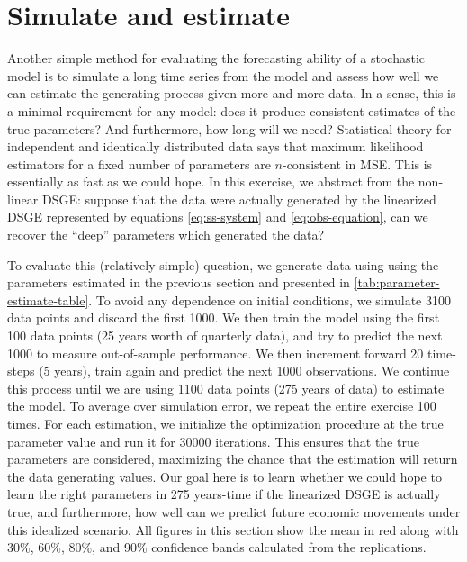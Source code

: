\documentclass[11pt]{article}
\begin{document}
\hypertarget{sec:simulate-estimate}{%
\section{Simulate and estimate}\label{sec:simulate-estimate}}

Another simple method for evaluating the forecasting ability of a
stochastic model is to simulate a long time series from the model and
assess how well we can estimate the generating process given more and
more data. In a sense, this is a minimal requirement for any model: does
it produce consistent estimates of the true parameters? And furthermore,
how long will we need? Statistical theory for independent and
identically distributed data says that maximum likelihood estimators for
a fixed number of parameters are \(n\)-consistent in MSE. This is
essentially as fast as we could hope. In this exercise, we abstract from
the non-linear DSGE: suppose that the data were actually generated by
the linearized DSGE represented by equations \eqref{eq:ss-system} and
\eqref{eq:obs-equation}, can we recover the ``deep'' parameters which
generated the data?

To evaluate this (relatively simple) question, we generate data using
using the parameters estimated in the previous section and presented in
\autoref{tab:parameter-estimate-table}. To avoid any dependence on
initial conditions, we simulate 3100 data points and discard the first
1000. We then train the model using the first 100 data points (25 years
worth of quarterly data), and try to predict the next 1000 to measure
out-of-sample performance. We then increment forward 20 time-steps (5
years), train again and predict the next 1000 observations. We continue
this process until we are using 1100 data points (275 years of data) to
estimate the model. To average over simulation error, we repeat the
entire exercise 100 times. For each estimation, we initialize the
optimization procedure at the true parameter value and run it for 30000
iterations. This ensures that the true parameters are considered,
maximizing the chance that the estimation will return the data
generating values. Our goal here is to learn whether we could hope to
learn the right parameters in 275 years-time if the linearized DSGE is
actually true, and furthermore, how well can we predict future economic
movements under this idealized scenario. All figures in this section
show the mean in red along with 30\%, 60\%, 80\%, and 90\% confidence
bands calculated from the replications.
\end{document}
